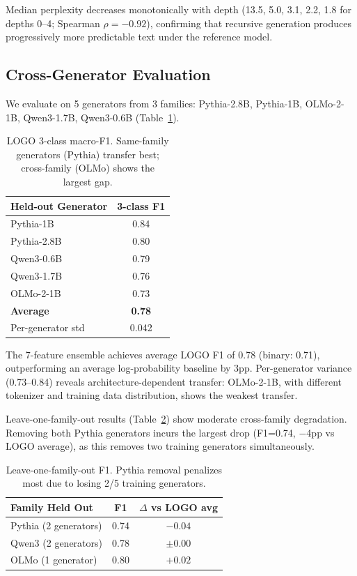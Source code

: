 \documentclass[11pt,a4paper]{article}
\begin{document}
Median perplexity decreases monotonically with depth (13.5, 5.0, 3.1, 2.2, 1.8 for depths 0--4; Spearman $\rho = -0.92$), confirming that recursive generation produces progressively more predictable text under the reference model.

\subsection{Cross-Generator Evaluation}
\label{sec:cross_gen}

We evaluate on 5 generators from 3 families: Pythia-2.8B, Pythia-1B, OLMo-2-1B, Qwen3-1.7B, Qwen3-0.6B (Table~\ref{tab:logo}).

\begin{table}[h]
\centering
\begin{tabular}{lc}
\toprule
\textbf{Held-out Generator} & \textbf{3-class F1} \\
\midrule
Pythia-1B & 0.84 \\
Pythia-2.8B & 0.80 \\
Qwen3-0.6B & 0.79 \\
Qwen3-1.7B & 0.76 \\
OLMo-2-1B & 0.73 \\
\midrule
\textbf{Average} & \textbf{0.78} \\
Per-generator std & 0.042 \\
\bottomrule
\end{tabular}
\caption{LOGO 3-class macro-F1. Same-family generators (Pythia) transfer best; cross-family (OLMo) shows the largest gap.}
\label{tab:logo}
\end{table}

The 7-feature ensemble achieves average LOGO F1 of 0.78 (binary: 0.71), outperforming an average log-probability baseline by 3pp.
Per-generator variance (0.73--0.84) reveals architecture-dependent transfer: OLMo-2-1B, with different tokenizer and training data distribution, shows the weakest transfer.

Leave-one-family-out results (Table~\ref{tab:family_out}) show moderate cross-family degradation.
Removing both Pythia generators incurs the largest drop (F1=0.74, $-$4pp vs LOGO average), as this removes two training generators simultaneously.

\begin{table}[h]
\centering
\begin{tabular}{lcc}
\toprule
\textbf{Family Held Out} & \textbf{F1} & \textbf{$\Delta$ vs LOGO avg} \\
\midrule
Pythia (2 generators) & 0.74 & $-0.04$ \\
Qwen3 (2 generators) & 0.78 & $\pm 0.00$ \\
OLMo (1 generator) & 0.80 & $+0.02$ \\
\bottomrule
\end{tabular}
\caption{Leave-one-family-out F1. Pythia removal penalizes most due to losing 2/5 training generators.}
\label{tab:family_out}
\end{table}
\end{document}
